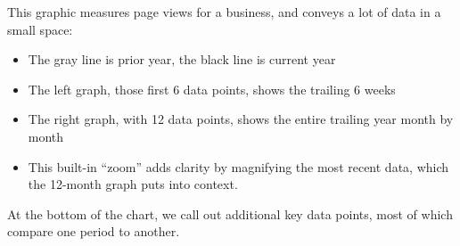 \documentclass{tufte-handout}
\begin{document}
  \par This graphic\cite{Bryar2021} measures page views for a business, and conveys a lot of data in a small space:
  \begin{itemize}
    \item{The gray line is prior year, the black line is current year}
    \item{The left graph, those first 6 data points, shows the trailing 6 weeks}
    \item{The right graph, with 12 data points, shows the entire trailing year month by month}
    \item{This built-in “zoom” adds clarity by magnifying the most recent data, which the 12-month graph puts into context.}
  \end{itemize}
  At the bottom of the chart, we call out additional key data points, most of which compare one period to another.\par


\newpage


\end{document}
